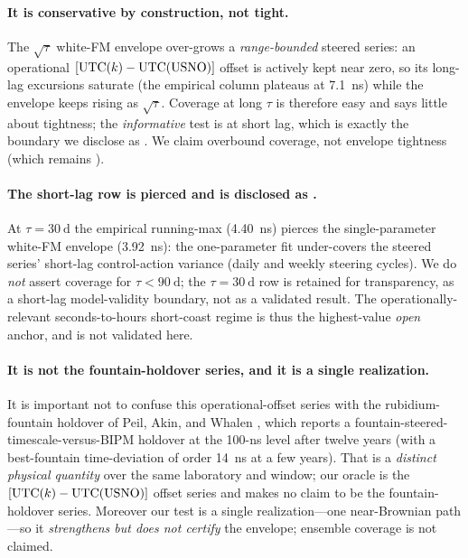 \paragraph{It is conservative by construction, not tight.}
The $\sqrt{\tau}$ white-FM envelope over-grows a \emph{range-bounded} steered
series: an operational $[\mathrm{UTC}(k){}-\mathrm{UTC(USNO)}]$ offset is actively kept near
zero, so its long-lag excursions saturate (the empirical column plateaus at
\SI{7.1}{\nano\second}) while the envelope keeps rising as $\sqrt{\tau}$. Coverage
at long $\tau$ is therefore easy and says little about tightness; the
\emph{informative} test is at short lag, which is exactly the boundary we disclose
as \Modelled{}. We claim overbound coverage, not envelope tightness (which remains
\Modelled{}).

\paragraph{The short-lag row is pierced and is disclosed as \Modelled{}.}
At $\tau=\SI{30}{\day}$ the empirical running-max (\SI{4.40}{\nano\second}) pierces
the single-parameter white-FM envelope (\SI{3.92}{\nano\second}): the one-parameter
fit under-covers the steered series' short-lag control-action variance (daily and
weekly steering cycles). We do \emph{not} assert coverage for $\tau<\SI{90}{\day}$;
the $\tau=\SI{30}{\day}$ row is retained for transparency, as a \Modelled{}
short-lag model-validity boundary, not as a validated result. The
operationally-relevant seconds-to-hours short-coast regime is thus the
highest-value \emph{open} anchor, and is not validated here.

\paragraph{It is not the fountain-holdover series, and it is a single realization.}
It is important not to confuse this operational-offset series with the
rubidium-fountain holdover of Peil, Akin, and Whalen \citep{peil2025}, which
reports a fountain-steered-timescale-versus-BIPM holdover at the 100-ns level after
twelve years (with a best-fountain time-deviation of order \SI{14}{\nano\second} at
a few years). That is a \emph{distinct physical quantity} over the same laboratory
and window; our oracle is the $[\mathrm{UTC}(k){}-\mathrm{UTC(USNO)}]$ offset series and
makes no claim to be the fountain-holdover series. Moreover our test is a single
realization---one near-Brownian path---so it \emph{strengthens but does not
certify} the envelope; ensemble coverage is not claimed.

